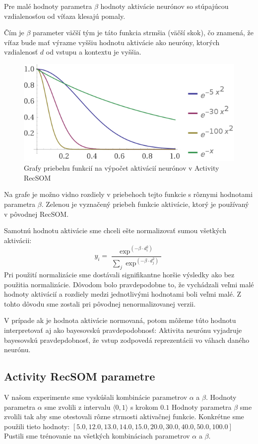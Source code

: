 Pre malé hodnoty parametra $\beta$ hodnoty aktivácie neurónov so stúpajúcou vzdialenosťou od víťaza
klesajú pomaly. 

Čím je $\beta$ parameter väčší tým je táto funkcia strmšia (väčší skok), čo znamená, že víťaz bude mať výrazne vyššiu hodnotu aktivácie
ako neuróny, ktorých vzdialenosť $d$ od vstupu a kontextu je vyššia.

\begin{figure}[H]
    \centering
    \includegraphics[width=\textwidth]{assets/plots}
    \caption{Grafy priebehu funkcií na výpočet aktivácií neurónov v Activity RecSOM}
\end{figure}
Na grafe je možno vidno rozdiely v priebehoch tejto funkcie s rôznymi hodnotami parametra $\beta$. Zelenou 
je vyznačený priebeh funkcie aktivácie, ktorý je používaný v pôvodnej RecSOM.

Samotnú hodnotu aktivácie sme chceli ešte normalizovať sumou všetkých aktivácii:
\begin{equation}
    y_{i} = \frac{\exp^{(-\beta \cdot d_{i}^{2})}}{\sum_{j} \exp^{(-\beta \cdot d_{j}^{2})}}
\end{equation}
Pri použití normalizácie sme dostávali signifikantne horšie výsledky
ako bez použitia normalizácie. Dôvodom bolo pravdepodobne to, že vychádzali veľmi malé
hodnoty aktivácií a rozdiely medzi jednotlivými hodnotami boli veľmi malé. Z tohto dôvodu sme zostali 
pri pôvodnej nenormalizovanej verzii.

V prípade ak je hodnota aktivácie normovaná, potom môžeme túto
hodnotu interpretovať aj ako bayesovskú pravdepodobnosť:
Aktivita neurónu vyjadruje bayesovskú pravdepdobnosť, že vstup zodpovedá reprezentácii vo váhach daného neurónu.

\subsection{Activity RecSOM parametre}
V našom experimente sme vyskúšali kombinácie parametrov $\alpha$ a $\beta$.
Hodnoty parametra $\alpha$ sme zvolili z intervalu $\langle0, 1\rangle$ s krokom $0.1$
Hodnoty parametra $\beta$ sme zvolili tak aby sme otestovali rôzne strmosti aktivačnej funkcie.
Konkrétne sme použili tieto hodnoty: $[5.0, 12.0, 13.0, 14.0, 15.0, 20.0, 30.0, 40.0, 50.0, 100.0]$
Pustili sme trénovanie na všetkých kombináciach parametrov $\alpha$ a $\beta$.

